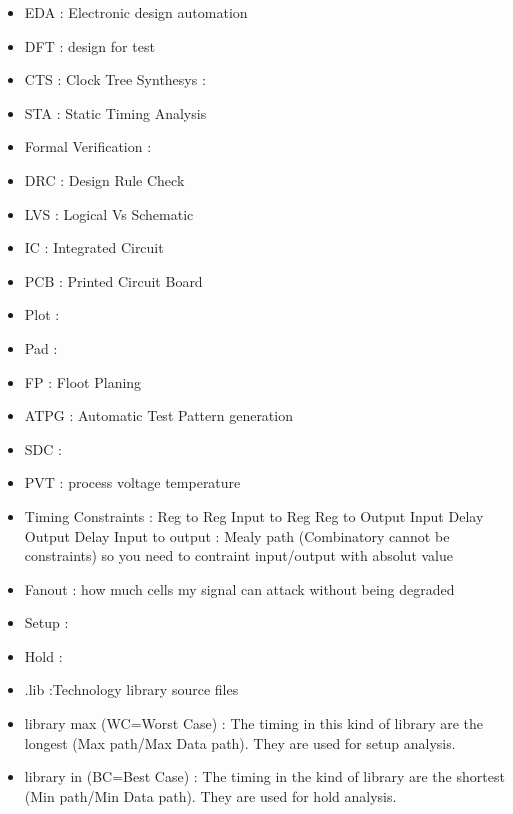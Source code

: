 \documentclass[11pt,a4paper,sans]{report}
\begin{document}
\begin{itemize}
	\item EDA : Electronic design automation
	\item DFT : design for test %
	\item CTS : Clock Tree Synthesys : %
	\item STA : Static Timing Analysis  %

	\item Formal Verification :
	\item DRC : Design Rule Check %
	\item LVS : Logical Vs Schematic %
	\item IC : Integrated Circuit
	\item PCB : Printed Circuit Board
	\item Plot : %
	\item Pad : %
	\item FP : Floot Planing %
	\item ATPG : Automatic Test Pattern generation
	\item SDC :

	\item PVT : process voltage temperature %

	\item Timing Constraints :
		Reg to Reg
		Input to Reg
		Reg to Output
		Input Delay
		Output Delay
		Input to output : Mealy path (Combinatory cannot be constraints) so you need to contraint input/output with absolut value


	\item Fanout : how much cells my signal can attack without being degraded

	\item Setup :
	\item Hold :

	\item .lib :Technology library source files

	\item library max (WC=Worst Case) : The timing in this kind of library are the longest (Max path/Max Data path). They are used for setup analysis. 
	\item library in (BC=Best Case) : The timing in the kind of library are the shortest (Min path/Min Data path). They are used for hold analysis.
	


\end{itemize}
\end{document}
